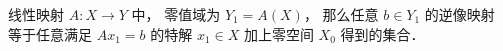 

\begin{theorem}{}
线性映射 $A:X\to Y$ 中， 零值域为 $Y_1 = A(X)$， 那么任意 $b \in Y_1$ 的逆像映射 等于任意满足 $Ax_1 = b$ 的特解 $x_1 \in X$ 加上零空间 $X_0$ 得到的集合．
\end{theorem}
